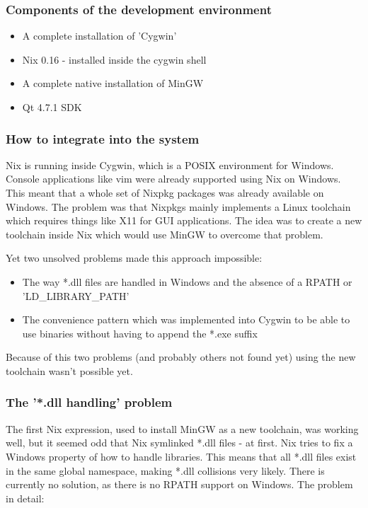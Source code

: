 \documentclass[a4paper,10pt]{article}
\begin{document}
\subsubsection*{Components of the development environment}
\begin{itemize}
 \item A complete installation of 'Cygwin'
 \item Nix 0.16 - installed inside the cygwin shell
 \item A complete native installation of MinGW 
 \item Qt 4.7.1 SDK
\end{itemize}

\subsubsection*{How to integrate into the system}
Nix is running inside Cygwin, which is a POSIX environment for Windows. Console applications like vim were already supported using Nix on Windows. This meant that a whole set of Nixpkg packages was already available on Windows. The problem was that Nixpkgs mainly implements a Linux toolchain which requires things like X11 for GUI applications. The idea was to create a new toolchain inside Nix which would use MinGW to overcome that problem.

Yet two unsolved problems made this approach impossible:
\begin{itemize}
 \item The way *.dll files are handled in Windows and the absence of a RPATH or 'LD\_LIBRARY\_PATH'
 \item The convenience pattern which was implemented into Cygwin to be able to use binaries without having to append the *.exe suffix
\end{itemize}
Because of this two problems (and probably others not found yet) using the new toolchain wasn't possible yet.

\subsubsection*{The '*.dll handling' problem}
\label{dllhandling}
The first Nix expression, used to install MinGW as a new toolchain, was working well, but it seemed odd that Nix symlinked *.dll files - at first. Nix tries to fix a Windows property of how to handle libraries. This means that all *.dll files exist in the same global namespace, making *.dll collisions very likely. There is currently no solution, as there is no RPATH support on Windows. The problem in detail:
\end{document}
